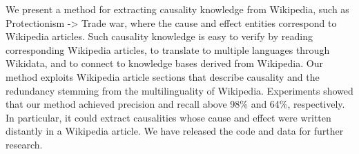 We present a method for extracting causality knowledge from Wikipedia, such as Protectionism -> Trade war, where the cause and effect entities correspond to Wikipedia articles. Such causality knowledge is easy to verify by reading corresponding Wikipedia articles, to translate to multiple languages through Wikidata, and to connect to knowledge bases derived from Wikipedia. Our method exploits Wikipedia article sections that describe causality and the redundancy stemming from the multilinguality of Wikipedia. Experiments showed that our method achieved precision and recall above 98\% and 64\%, respectively. In particular, it could extract causalities whose cause and effect were written distantly in a Wikipedia article. We have released the code and data for further research.
